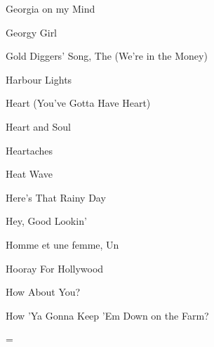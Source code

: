 \M Georgia on my Mind

\M Georgy  Girl

\M Gold Diggers' Song, The (We're in the Money)

\M Harbour Lights

\M Heart (You've Gotta Have Heart)

\M Heart and Soul

\M Heartaches

\M Heat Wave

\M Here's That Rainy Day

\M Hey, Good Lookin'

\M Homme et une femme, Un

\M Hooray For Hollywood

\M How About You?

\M How 'Ya Gonna Keep 'Em Down on the Farm?

\singlecolumn
\vfil\eject
\ifseparate
\else
\pagecnt=\pageno
\fi
\endinput

